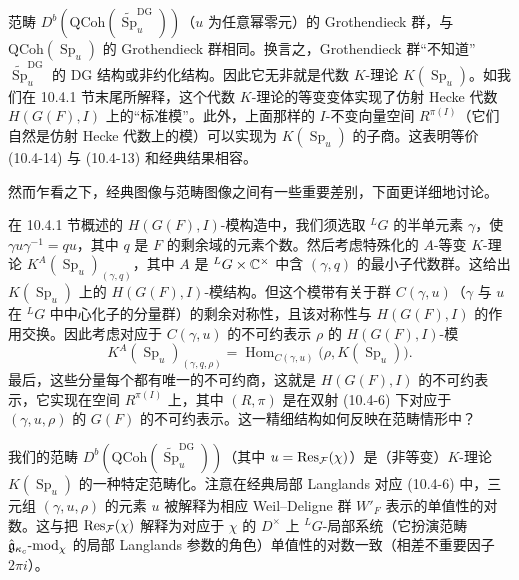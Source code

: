 范畴 $D^b(\mathrm{QCoh}(\widetilde{\operatorname{Sp}}^{\mathrm{DG}}_u))$（$u$ 为任意幂零元）的 Grothendieck 群，与 $\mathrm{QCoh}(\operatorname{Sp}_u)$ 的 Grothendieck 群相同。换言之，Grothendieck 群“不知道”$\widetilde{\operatorname{Sp}}^{\mathrm{DG}}_u$ 的 DG 结构或非约化结构。因此它无非就是代数 $K$-理论 $K(\operatorname{Sp}_u)$。如我们在 10.4.1 节末尾所解释，这个代数 $K$-理论的等变变体实现了仿射 Hecke 代数 $H(G(F),I)$ 上的“标准模”。此外，上面那样的 $I$-不变向量空间 $R^{\pi(I)}$（它们自然是仿射 Hecke 代数上的模）可以实现为 $K(\operatorname{Sp}_u)$ 的子商。这表明等价 (10.4-14) 与 (10.4-13) 和经典结果相容。

然而乍看之下，经典图像与范畴图像之间有一些重要差别，下面更详细地讨论。

在 10.4.1 节概述的 $H(G(F),I)$-模构造中，我们须选取 ${}^L G$ 的半单元素 $\gamma$，使 $\gamma u\gamma^{-1}=qu$，其中 $q$ 是 $F$ 的剩余域的元素个数。然后考虑特殊化的 $A$-等变 $K$-理论 $K^A(\operatorname{Sp}_u)_{(\gamma,q)}$，其中 $A$ 是 ${}^L G\times\mathbb{C}^\times$ 中含 $(\gamma,q)$ 的最小子代数群。这给出 $K(\operatorname{Sp}_u)$ 上的 $H(G(F),I)$-模结构。但这个模带有关于群 $C(\gamma,u)$（$\gamma$ 与 $u$ 在 ${}^L G$ 中中心化子的分量群）的剩余对称性，且该对称性与 $H(G(F),I)$ 的作用交换。因此考虑对应于 $C(\gamma,u)$ 的不可约表示 $\rho$ 的 $H(G(F),I)$-模
\[
    K^A(\operatorname{Sp}_u)_{(\gamma,q,\rho)}
    =\operatorname{Hom}_{C(\gamma,u)}\bigl(\rho,K(\operatorname{Sp}_u)\bigr).
\]
最后，这些分量每个都有唯一的不可约商，这就是 $H(G(F),I)$ 的不可约表示，它实现在空间 $R^{\pi(I)}$ 上，其中 $(R,\pi)$ 是在双射 (10.4-6) 下对应于 $(\gamma,u,\rho)$ 的 $G(F)$ 的不可约表示。这一精细结构如何反映在范畴情形中？

我们的范畴 $D^b(\mathrm{QCoh}(\widetilde{\operatorname{Sp}}^{\mathrm{DG}}_u))$（其中 $u=\operatorname{Res}_{\mathcal{F}}(\chi)$）是（非等变）$K$-理论 $K(\operatorname{Sp}_u)$ 的一种特定范畴化。注意在经典局部 Langlands 对应 (10.4-6) 中，三元组 $(\gamma,u,\rho)$ 的元素 $u$ 被解释为相应 Weil--Deligne 群 $W'_F$ 表示的单值性的对数。这与把 $\operatorname{Res}_{\mathcal{F}}(\chi)$ 解释为对应于 $\chi$ 的 $D^\times$ 上 ${}^L G$-局部系统（它扮演范畴 $\hat{\mathfrak{g}}_{\kappa_c}\text{-}\mathrm{mod}_\chi$ 的局部 Langlands 参数的角色）单值性的对数一致（相差不重要因子 $2\pi i$）。

